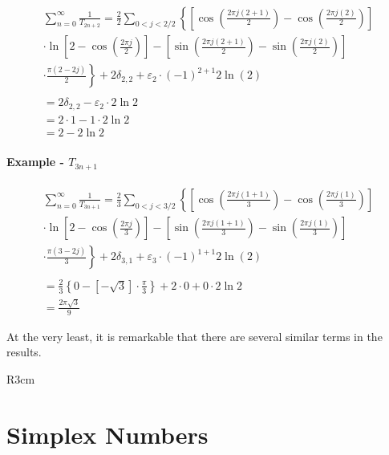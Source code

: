 \documentclass{article}
\newcommand{\tri}[2] {#1^{\Delta #2}}
\begin{document}
\begin{align*}
\sum_{n=0}^\infty \frac{1}{T_{2n+2}} = 
		\frac{2}{2} \sum\limits_{0<j<2/2} \left\{ 
		\left[
			\cos \left(\frac{2 \pi j (2+1)}{2} \right) - \cos \left( \frac{2 \pi j (2)}{2} \right)
		\right] \right. \\
		\left. \cdot \ln \left[ 
		2 - \cos \left( \frac{2 \pi j}{2} \right)
		\right]
		- \left[ \sin \left(\frac{2 \pi j (2+1)}{2} \right) - \sin \left( \frac{2 \pi j (2)}{2} \right) \right] \right. \\
		\left. \cdot \frac{\pi (2 - 2j)}{2}
		\right\} + 2 \delta_{2,2} + \varepsilon_2 \cdot (-1)^{2+1} 2 \ln(2)\\
		\\
		= 2 \delta_{2,2}-\varepsilon_{2} \cdot 2 \ln 2\\
		= 2 \cdot 1 - 1\cdot 2 \ln 2\\
		= 2 - 2 \ln 2
\end{align*}

\paragraph{Example  - $T_{3n+1}$}

\begin{align*}
		\sum_{n=0}^\infty \frac{1}{T_{3n+1}} = 
		\frac{2}{3} \sum\limits_{0<j<3/2} \left\{ 
		\left[
			\cos \left(\frac{2 \pi j (1+1)}{3} \right) - \cos \left( \frac{2 \pi j (1)}{3} \right)
		\right] \right. \\
		\left. \cdot \ln \left[ 
		2 - \cos \left( \frac{2 \pi j}{3} \right)
		\right]
		- \left[ \sin \left(\frac{2 \pi j (1+1)}{3} \right) - \sin \left( \frac{2 \pi j (1)}{3} \right) \right] \right. \\
		\left. \cdot \frac{\pi (3 - 2j)}{3}
		\right\} + 2 \delta_{3,1} + \varepsilon_3 \cdot (-1)^{1+1} 2 \ln(2)\\
		\\
		= \frac{2}{3} \left\{ 0 - [-\sqrt{3}] \cdot \frac{\pi}{3} \right\} + 2 \cdot 0 + 0 \cdot 2 \ln 2\\
		= \frac{2 \pi \sqrt{3} }{9}
\end{align*}

At the very least, it is remarkable that there are several similar terms in the results.

\begin{wrapfigure}{R}{3cm}

\caption{$\tri{3}{3}= 10$\label{tetrahedral}}
\end{wrapfigure}
\section{Simplex Numbers}
\end{document}
